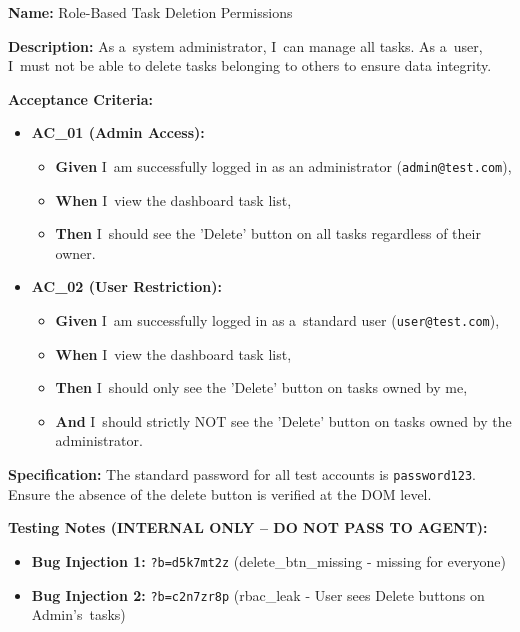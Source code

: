 \documentclass[czech, ing, kiv, he, iso690numb, viewonly]{fasthesis}
\begin{document}
\begin{tcolorbox}[breakable, colback=gray!4, colframe=black!35, boxrule=0.4pt, arc=2pt, boxsep=1pt, left=3pt, right=3pt, top=2pt, bottom=2pt, before skip=6pt, after skip=6pt, fontupper=\small, title={US-07 -- Role-Based Task Deletion Permissions}]
\textbf{Name:} Role-Based Task Deletion Permissions

\textbf{Description:} As a~system administrator, I~can manage all tasks. As a~user, I~must not be able to delete tasks belonging to others to ensure data integrity.

\textbf{Acceptance Criteria:}
\begin{itemize}
    \item \textbf{AC\_01 (Admin Access):}
    \begin{itemize}
      \item \textbf{Given} I~am successfully logged in as an administrator (\texttt{admin@test.com}),
      \item \textbf{When} I~view the dashboard task list,
      \item \textbf{Then} I~should see the 'Delete' button on all tasks regardless of their owner.
    \end{itemize}
    \item \textbf{AC\_02 (User Restriction):}
    \begin{itemize}
      \item \textbf{Given} I~am successfully logged in as a~standard user (\texttt{user@test.com}),
      \item \textbf{When} I~view the dashboard task list,
      \item \textbf{Then} I~should only see the 'Delete' button on tasks owned by me,
      \item \textbf{And} I~should strictly NOT see the 'Delete' button on tasks owned by the administrator.
    \end{itemize}
\end{itemize}

\textbf{Specification:} The standard password for all test accounts is \texttt{password123}. Ensure the absence of the delete button is verified at the DOM level.

\textbf{\textcolor{BrickRed}{Testing Notes (INTERNAL ONLY -- DO NOT PASS TO AGENT):}}
\begin{itemize}
    \item \textbf{Bug Injection 1:} \texttt{?b=d5k7mt2z} (delete\_btn\_missing - missing for everyone)
    \item \textbf{Bug Injection 2:} \texttt{?b=c2n7zr8p} (rbac\_leak - User sees Delete buttons on Admin's~tasks)
\end{itemize}
\end{tcolorbox}
\end{document}
